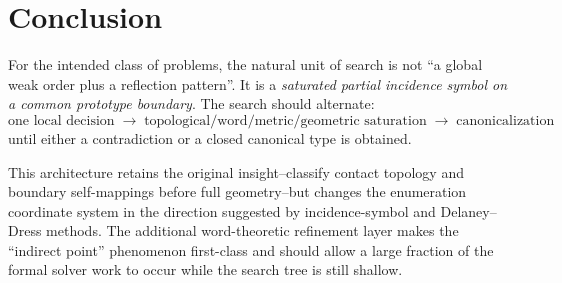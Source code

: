 \documentclass[11pt]{article}
\begin{document}
\section{Conclusion}

For the intended class of problems, the natural unit of search is not ``a global weak order plus a reflection pattern''.  It is a \emph{saturated partial incidence symbol on a common prototype boundary}.  The search should alternate:
\[
  \boxed{\text{one local decision}
  \;\longrightarrow\;
  \text{topological/word/metric/geometric saturation}
  \;\longrightarrow\;
  \text{canonicalization}}
\]
until either a contradiction or a closed canonical type is obtained.

This architecture retains the original insight--classify contact topology and boundary self-mappings before full geometry--but changes the enumeration coordinate system in the direction suggested by incidence-symbol and Delaney--Dress methods.  The additional word-theoretic refinement layer makes the ``indirect point'' phenomenon first-class and should allow a large fraction of the formal solver work to occur while the search tree is still shallow.
\end{document}
